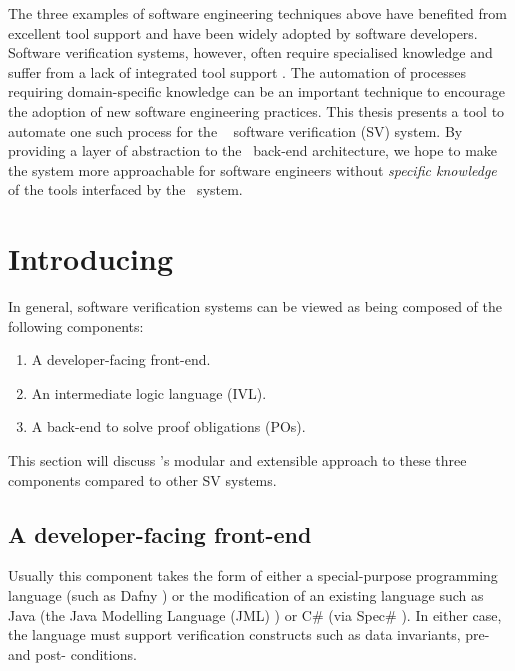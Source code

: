 The three examples of software engineering techniques above have benefited from excellent tool support and have been widely adopted by software developers.      
Software verification systems, however, often require specialised knowledge and suffer from a lack of integrated tool support \cite{Alglave2011}.     
The automation of processes requiring domain-specific knowledge can be an important technique to encourage the adoption of new software engineering practices.
This thesis presents a tool to automate one such process for the \why~\cite{why:shephard} software verification (SV) system. 
By providing a layer of abstraction to the \why~back-end architecture, we hope to make the system more approachable for software engineers without \textit{specific knowledge} of the tools interfaced by the \why~system. 
 
\section{Introducing \why}
In general, software verification systems can be viewed as being composed of the following components: 

\begin{enumerate}
	\item A developer-facing front-end.
	\item An intermediate logic language (IVL).
	\item A back-end to solve proof obligations (POs).
\end{enumerate}

This section will discuss \why's modular and extensible approach to these three components compared to other SV systems. 

\subsection{A developer-facing front-end} 

Usually this component takes the form of either a special-purpose programming language (such as Dafny \cite{Dafny}) or the modification of an existing language such as Java (the Java Modelling Language (JML) \cite{JML}) or C\# (via Spec\# \cite{spec}). 
In either case, the language must support verification constructs such as data invariants, pre- and post- conditions.

